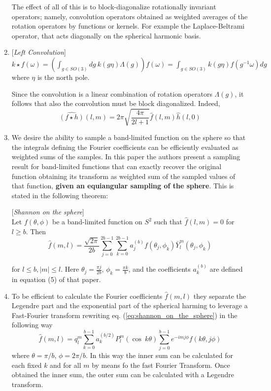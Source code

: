 \begin{enumerate}
	The effect of all of this is to block-diagonalize rotationally invariant operators; namely, convolution operators obtained as weighted averages of the rotation operators by functions or kernels. For example the Laplace-Beltrami operator, that acts diagonally on the spherical harmonic basis.
	\item \begin{definition}{[\textit{Left Convolution}]}\\
		$k\star f(\omega) = \left(\int_{g\in SO(3)}dg\ k(g\eta)\Lambda(g)\right)f(\omega) = \int_{g\in SO(3)}k(g\eta)f(g^{-1}\omega)dg$
		where $\eta$ is the north pole. 
	\end{definition}
Since the convolution is a linear combination of rotation operators $\Lambda(g)$, it follows that also the convolution must be block diagonalized. Indeed,
$$\hat {(f \star h)}(l,m) = 2\pi \sqrt{\frac{4\pi}{2l+1}}\hat f(l,m) \hat h(l,0) $$

\item We desire the ability to sample a band-limited function on the sphere so that the integrals defining the Fourier coefficients can be efficiently evaluated as weighted sums of the samples. In this paper the authors present a sampling result for band-limited functions that can exactly recover the original function obtaining its transform as weighted sum of the sampled values of that function, \textbf{given an equiangular sampling of the sphere}. This is stated in the following theorem:
\begin{theorem}{[\textit{Shannon on the sphere}]}\\
	Let $f(\theta, \phi)$ be a band-limited function on $S^2$ such that $\hat f(l,m) = 0$ for $l\geq b$. Then
	\begin{equation}
			\hat f(m,l) = \frac{\sqrt{2\pi}}{2b}\sum_{j=0}^{2b-1}\sum_{k=0}^{2b-1}a_j^{(b)}f(\theta_j, \phi_k)\bar Y_l^m(\theta_j, \phi_k)
			\label{eq:shannon_on_the_sphere}
	\end{equation}

	for $l\leq b, |m|\leq l$. Here $\theta_j = \frac{\pi j}{2b}$, $\phi_k = \frac{\pi k}{b}$, and the coefficients $a_k^{(b)}$ are defined in equation (5) of that paper.
\end{theorem} 

\item To be efficient to calculate the Fourier coefficients $\hat f(m,l)$ they separate the Legendre part and the exponential part  of the spherical harming to leverage a Fast-Fourier transform rewriting eq. (\ref{eq:shannon_on_the_sphere}) in the following way
\begin{equation}
		\hat f(m,l) = q^m_l\sum_{k=0}^{b-1}a_k^{(b/2)}P_l^m(\cos\ k\theta)\sum_{j=0}^{b-1} e^{-imj\phi}f(k\theta, j\phi)
\end{equation}
where $\theta = \pi/b$, $\phi = 2\pi/b$. In this way the inner sum can be calculated for each fixed $k$ and for all $m$ by means fo the fast Fourier Transform. Once obtained the inner sum, the outer sum can be calculated with a Legendre transform.
\end{enumerate}
